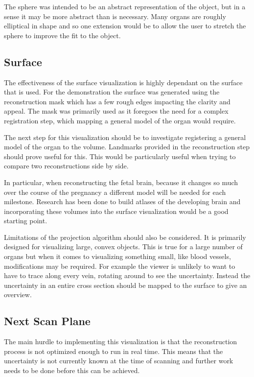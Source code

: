 The sphere was intended to be an abstract representation of the object, but in a sense it may be more abstract than is necessary. Many organs are roughly elliptical in shape and so one extension would be to allow the user to stretch the sphere to improve the fit to the object.

\subsection*{Surface}
The effectiveness of the surface visualization is highly dependant on the surface that is used. For the demonstration the surface was generated using the reconstruction mask which has a few rough edges impacting the clarity and appeal. The mask was primarily used as it foregoes the need for a complex registration step, which mapping a general model of the organ would require.

The next step for this visualization should be to investigate registering a general model of the organ to the volume. Landmarks provided in the reconstruction step should prove useful for this. This would be particularly useful when trying to compare two reconstructions side by side.

In particular, when reconstructing the fetal brain, because it changes so much over the course of the pregnancy a different model will be needed for each milestone. Research has been done to build atlases of the developing brain\cite{fetalatlas} and incorporating these volumes into the surface visualization would be a good starting point.

Limitations of the projection algorithm should also be considered. It is primarily designed for visualizing large, convex objects. This is true for a large number of organs but when it comes to visualizing something small, like blood vessels, modifications may be required. For example the viewer is unlikely to want to have to trace along every vein, rotating around to see the uncertainty. Instead the uncertainty in an entire cross section should be mapped to the surface to give an overview.

\subsection*{Next Scan Plane}
The main hurdle to implementing this visualization is that the reconstruction process is not optimized enough to run in real time. This means that the uncertainty is not currently known at the time of scanning and further work needs to be done before this can be achieved.

